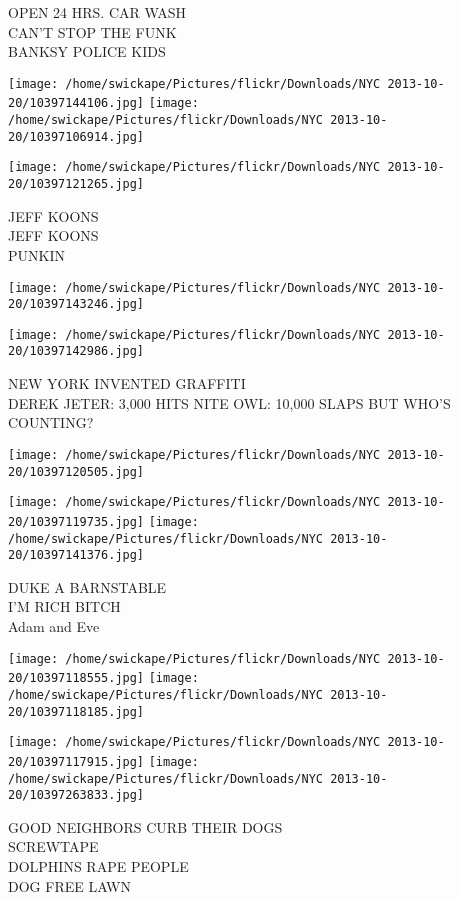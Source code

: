 \documentclass[10pt,letterpaper]{article}
\begin{document}
OPEN 24 HRS. CAR WASH\\
CAN'T STOP THE FUNK\\
BANKSY POLICE KIDS
\pagebreak

\texttt{[image: /home/swickape/Pictures/flickr/Downloads/NYC 2013-10-20/10397144106.jpg]}
\texttt{[image: /home/swickape/Pictures/flickr/Downloads/NYC 2013-10-20/10397106914.jpg]}

\vspace{0.25in}
\texttt{[image: /home/swickape/Pictures/flickr/Downloads/NYC 2013-10-20/10397121265.jpg]}

JEFF KOONS\\
JEFF KOONS\\
PUNKIN
\pagebreak

\texttt{[image: /home/swickape/Pictures/flickr/Downloads/NYC 2013-10-20/10397143246.jpg]}

\vspace{0.25in}
\texttt{[image: /home/swickape/Pictures/flickr/Downloads/NYC 2013-10-20/10397142986.jpg]}

NEW YORK INVENTED GRAFFITI\\
DEREK JETER: 3,000 HITS NITE OWL: 10,000 SLAPS BUT WHO'S COUNTING?
\pagebreak

\texttt{[image: /home/swickape/Pictures/flickr/Downloads/NYC 2013-10-20/10397120505.jpg]}

\vspace{0.25in}
\texttt{[image: /home/swickape/Pictures/flickr/Downloads/NYC 2013-10-20/10397119735.jpg]}
\texttt{[image: /home/swickape/Pictures/flickr/Downloads/NYC 2013-10-20/10397141376.jpg]}

DUKE A BARNSTABLE\\
I'M RICH BITCH\\
Adam and Eve
\pagebreak

\texttt{[image: /home/swickape/Pictures/flickr/Downloads/NYC 2013-10-20/10397118555.jpg]}
\texttt{[image: /home/swickape/Pictures/flickr/Downloads/NYC 2013-10-20/10397118185.jpg]}

\texttt{[image: /home/swickape/Pictures/flickr/Downloads/NYC 2013-10-20/10397117915.jpg]}
\texttt{[image: /home/swickape/Pictures/flickr/Downloads/NYC 2013-10-20/10397263833.jpg]}

GOOD NEIGHBORS CURB THEIR DOGS\\
SCREWTAPE\\
DOLPHINS RAPE PEOPLE\\
DOG FREE LAWN
\pagebreak
\end{document}
